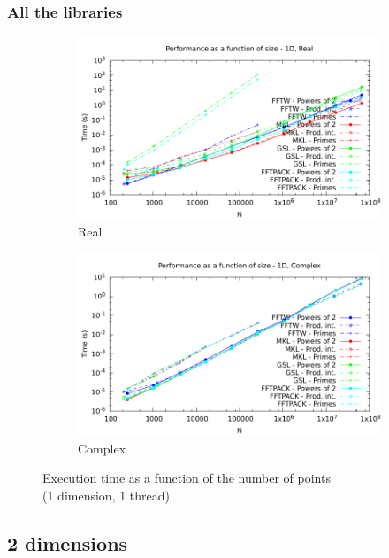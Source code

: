 \documentclass[12pt, a4paper]{article}
\begin{document}
\subsubsection{All the libraries}
\begin{figure}[H]
\captionsetup{width=0.8\linewidth}
\centering
\begin{subfigure}{.5\textwidth}
\centering
\includegraphics[width=.9\linewidth]{graphs/performance/1d-r.pdf}
\caption{Real}
\label{1DR}
\end{subfigure}%
\begin{subfigure}{.5\textwidth}
\centering
\includegraphics[width=.9\linewidth]{graphs/performance/1d-c.pdf}
\caption{Complex}
\label{1DC}
\end{subfigure}
\caption{Execution time as a function of the number of points\\(1 dimension, 1 thread)}
\label{1D}
\end{figure}

\subsection{2 dimensions}\label{2DS}
\end{document}
